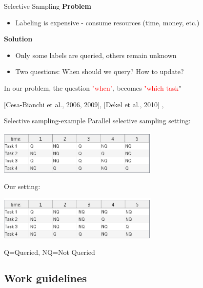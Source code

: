 \documentclass{beamer}
\begin{document}
\begin{frame}{Selective Sampling}
\textbf{Problem} \newline
\begin{itemize}
\item Labeling  is  expensive - consume resources (time, money, etc.) \newline
\end{itemize}
\textbf{Solution} \newline
\begin{itemize}
\item Only some  labels are queried, others remain unknown\newline
\item Two questions: When should we query? How to update?\newline
\end{itemize}

In our problem, the question \textcolor{red}{"when"}, becomes \textcolor{red}{"which task}"\newline

[Cesa-Bianchi et al., 2006, 2009], [Dekel et al., 2010] ,\newline
[Crammer , 2014] \newline
\end{frame}

\begin{frame}{Selective sampling-example}
Parallel selective sampling setting:
\begin{center}
\includegraphics[width=0.6\textwidth]{figs/Table_ss.eps}
\end{center}
Our setting:
\begin{center}
\includegraphics[width=0.6\textwidth]{figs/Table_shampo.eps}
\end{center}
Q=Queried,   NQ=Not Queried
\end{frame}

\subsection{Work guidelines}
\end{document}
